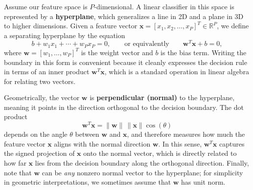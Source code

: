 \documentclass{article}
\begin{document}
Assume our feature space is \(P\)-dimensional. A linear classifier in this space is represented by a \textbf{hyperplane}, which generalizes a line in 2D and a plane in 3D to higher dimensions. Given a feature vector \(\mathbf{x} = [x_1, x_2, \dots, x_P]^T \in \mathbb{R}^P\), we define a separating hyperplane by the equation
\[
b + w_1x_1 + \cdots + w_Px_P = 0,
\qquad \text{or equivalently} \qquad
\mathbf{w}^T\mathbf{x} + b = 0,
\]
where \(\mathbf{w} = [w_1,\dots,w_P]^T\) is the weight vector and \(b\) is the bias term. Writing the boundary in this form is convenient because it cleanly expresses the decision rule in terms of an inner product \(\mathbf{w}^T\mathbf{x}\), which is a standard operation in linear algebra for relating two vectors.

Geometrically, the vector $\mathbf{w}$ is \textbf{perpendicular (normal)} to the hyperplane, meaning it points in the direction orthogonal to the decision boundary. The dot product
\[
\mathbf{w}^T \mathbf{x} = \|\mathbf{w}\| \, \|\mathbf{x}\| \cos(\theta)
\]
depends on the angle $\theta$ between $\mathbf{w}$ and $\mathbf{x}$, and therefore measures how much the feature vector $\mathbf{x}$ aligns with the normal direction $\mathbf{w}$. In this sense, $\mathbf{w}^T \mathbf{x}$ captures the signed projection of $\mathbf{x}$ onto the normal vector, which is directly related to how far $\mathbf{x}$ lies from the decision boundary along the orthogonal direction. Finally, note that $\mathbf{w}$ can be \emph{any} nonzero normal vector to the hyperplane; for simplicity in geometric interpretations, we sometimes assume that $\mathbf{w}$ has unit norm.
\end{document}
